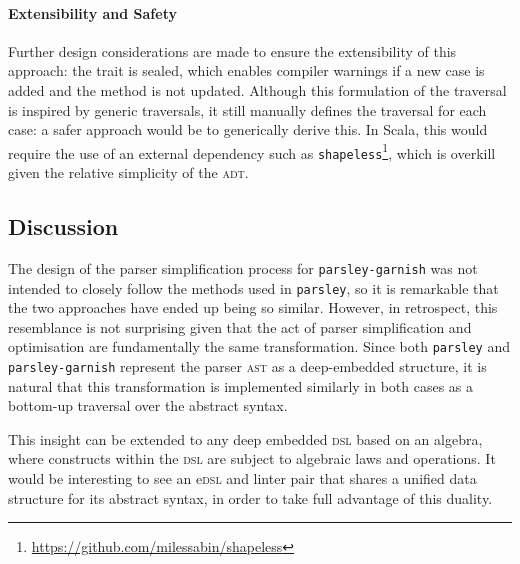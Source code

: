 \documentclass[../../../main.tex]{subfiles}
\begin{document}
\paragraph{Extensibility and Safety}
Further design considerations are made to ensure the extensibility of this approach: the  trait is sealed, which enables compiler warnings if a new  case is added and the  method is not updated.
Although this formulation of the traversal is inspired by generic traversals, it still manually defines the traversal for each case: a safer approach would be to generically derive this.
In Scala, this would require the use of an external dependency such as \texttt{shapeless}\footnote{\url{https://github.com/milessabin/shapeless}},
which is overkill given the relative simplicity of the  \textsc{adt}.

\subsection{Discussion}
The design of the parser simplification process for \texttt{parsley-garnish} was not intended to closely follow the methods used in \texttt{parsley}, so it is remarkable that the two approaches have ended up being so similar.
However, in retrospect, this resemblance is not surprising given that the act of parser simplification and optimisation are fundamentally the same transformation.
Since both \texttt{parsley} and \texttt{parsley-garnish} represent the parser \textsc{ast} as a deep-embedded structure, it is natural that this transformation is implemented similarly in both cases as a bottom-up traversal over the abstract syntax.

This insight can be extended to any deep embedded \textsc{dsl} based on an algebra, where constructs within the \textsc{dsl} are subject to algebraic laws and operations.
It would be interesting to see an e\textsc{dsl} and linter pair that shares a unified data structure for its abstract syntax, in order to take full advantage of this duality.
\end{document}
